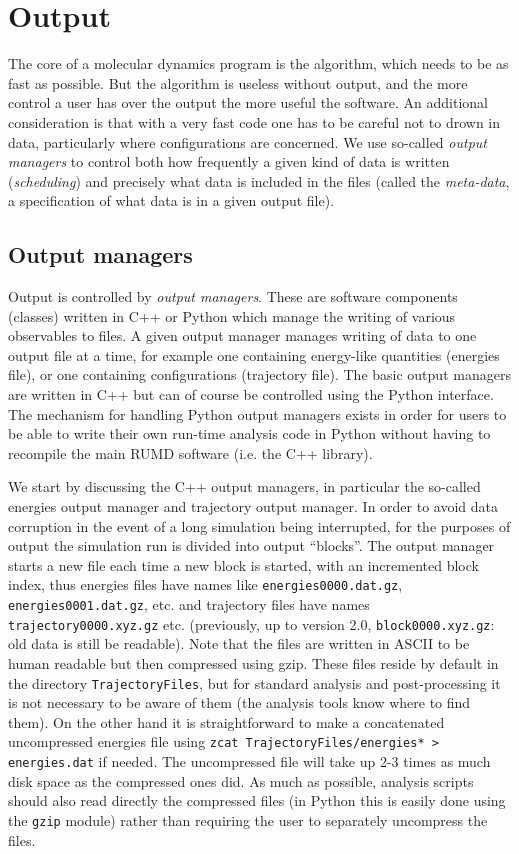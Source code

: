 \documentclass[a4paper]{article}
\begin{document}
\section{Output}

The core of a molecular dynamics program is the algorithm, which needs to be as fast as 
possible. But the algorithm 
is useless without output, and the more control a user
has over the output the more useful the software. An additional consideration
is that with a very fast code one has to be careful not to drown in data, 
particularly where configurations are concerned. We use so-called {\em output
managers} to control both how frequently a given kind of data is written
({\em scheduling}) and precisely what data is included in the files (called the 
{\em meta-data}, a specification of what data is in a given output file).


\subsection{Output managers}

Output is controlled by {\em output managers}. These are software components 
(classes) written in C++ or Python which manage the writing of various 
observables to files. A given output manager manages
writing of data to one output file at a time, 
for example one containing energy-like quantities (energies
file), or one containing configurations (trajectory file). The basic output 
managers are written in C++ but can of course be controlled using the Python
interface. The mechanism for handling Python output managers exists in order
for users to be able to write their own run-time analysis code in Python 
without having to recompile the main RUMD software (i.e. the C++ library).

We start by discussing the C++ output managers, in particular the so-called
energies output manager and trajectory output manager.
In order to avoid data corruption in the event of a long simulation being 
interrupted, for the purposes of output the simulation run is divided into
output ``blocks''. The output manager starts a new file each time a new block
is started, with an incremented block index, thus energies files have names
like \verb|energies0000.dat.gz|, \verb|energies0001.dat.gz|, etc. and 
trajectory files have names \verb|trajectory0000.xyz.gz| etc. (previously, up to
version 2.0, \verb|block0000.xyz.gz|: old data is still be readable). Note that
the files
are written in ASCII to be human readable but then compressed using gzip. 
These files reside by default in the directory \verb|TrajectoryFiles|, but for 
standard analysis and 
post-processing it is not necessary to be aware of them (the analysis tools
know where to find them). On the other hand it is straightforward to make
a concatenated uncompressed energies file using 
\verb|zcat TrajectoryFiles/energies* > energies.dat| if needed. The
 uncompressed file will take up 2-3 times as much disk space as the 
compressed ones did. As much as possible, analysis scripts should also read 
directly the compressed files
(in Python this is easily done using the \verb|gzip| module) rather than 
requiring the user to separately uncompress the files.
\end{document}

